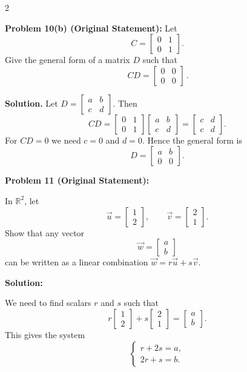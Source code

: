 \documentclass[8pt]{extarticle}
\begin{document}
\begin{multicols}{2}
\begin{tcolorbox}[title=]
\medskip
\textbf{Problem 10(b) (Original Statement):}\quad
Let
\[
C=\begin{bmatrix}0&1\\[2pt]0&1\end{bmatrix}.
\]
Give the general form of a matrix \(D\) such that
\[
\boxed{\,C D=\begin{bmatrix}0&0\\[2pt]0&0\end{bmatrix}\,}.
\]

\smallskip
\textbf{Solution.}
Let \(D=\begin{bmatrix}a&b\\ c&d\end{bmatrix}\).
Then
\[
C D=
\begin{bmatrix}0&1\\ 0&1\end{bmatrix}
\begin{bmatrix}a&b\\ c&d\end{bmatrix}
=
\begin{bmatrix}c&d\\ c&d\end{bmatrix}.
\]
For \(C D=0\) we need \(c=0\) and \(d=0\).
Hence the general form is
\[
D=\begin{bmatrix}a&b\\ 0&0\end{bmatrix}.
\]
\end{tcolorbox}
\begin{tcolorbox}[title=]
\noindent
\textbf{Problem 11 (Original Statement):}  

In \(\mathbb{R}^{2}\), let
\[
\vec{u}=
\begin{bmatrix}1\\2\end{bmatrix},\qquad
\vec{v}=
\begin{bmatrix}2\\1\end{bmatrix}.
\]
Show that any vector
\[
\vec{w}=
\begin{bmatrix}a\\b\end{bmatrix}
\]
can be written as a linear combination
\(\vec{w}=r\vec{u}+s\vec{v}\).

\bigskip
\noindent
\textbf{Solution:}

We need to find scalars \(r\) and \(s\) such that
\[
r
\begin{bmatrix}1\\2\end{bmatrix}
+
s
\begin{bmatrix}2\\1\end{bmatrix}
=
\begin{bmatrix}a\\b\end{bmatrix}.
\]
This gives the system
\[
\begin{cases}
r+2s=a,\\
2r+s=b.
\end{cases}
\]


\end{tcolorbox}
\end{multicols}
\end{document}
